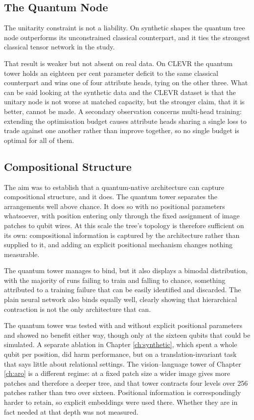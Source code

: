 \documentclass[12pt, a4paper, oneside]{report}
\begin{document}
\subsection{The Quantum Node}

The unitarity constraint is not a liability. On synthetic shapes the quantum tree node outperforms its unconstrained classical counterpart, and it ties the strongest classical tensor network in the study.

That result is weaker but not absent on real data. On CLEVR the quantum tower holds an eighteen per cent parameter deficit to the same classical counterpart and wins one of four attribute heads, tying on the other three. What can be said looking at the synthetic data and the CLEVR dataset is that the unitary node is not worse at matched capacity, but the stronger claim, that it is better, cannot be made. A secondary observation concerns multi-head training: extending the optimisation budget causes attribute heads sharing a single loss to trade against one another rather than improve together, so no single budget is optimal for all of them.

\subsection{Compositional Structure}

The aim was to establish that a quantum-native architecture can capture compositional structure, and it does. The quantum tower separates the arrangements well above chance. It does so with no positional parameters whatsoever, with position entering only through the fixed assignment of image patches to qubit wires. At this scale the tree's topology is therefore sufficient on its own: compositional information is captured by the architecture rather than supplied to it, and adding an explicit positional mechanism changes nothing measurable.

The quantum tower manages to bind, but it also displays a bimodal distribution, with the majority of runs failing to train and falling to chance, something attributed to a training failure that can be easily identified and discarded. The plain neural network also binds equally well, clearly showing that hierarchical contraction is not the only architecture that can.

The quantum tower was tested with and without explicit positional parameters and showed no benefit either way, though only at the sixteen qubits that could be simulated. A separate ablation in Chapter \ref{ch:synthetic}, which spent a whole qubit per position, did harm performance, but on a translation-invariant task that says little about relational settings. The vision--language tower of Chapter \ref{ch:aro} is a different regime: at a fixed patch size a wider image gives more patches and therefore a deeper tree, and that tower contracts four levels over 256 patches rather than two over sixteen. Positional information is correspondingly harder to retain, so explicit embeddings were used there. Whether they are in fact needed at that depth was not measured.
\end{document}
